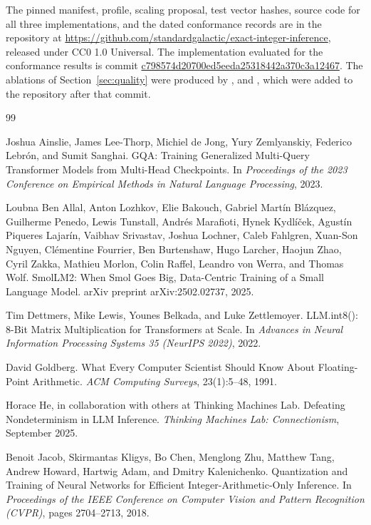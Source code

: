 \documentclass[11pt]{article}
\begin{document}
\begin{sloppypar}
The pinned manifest, profile, scaling proposal, test vector hashes, source code for all three implementations, and the dated conformance records are in the repository at \url{https://github.com/standardgalactic/exact-integer-inference}, released under CC0 1.0 Universal. The implementation evaluated for the conformance results is commit \url{c798574d20700ed5eeda25318442a370c3a12467}. The ablations of Section~\ref{sec:quality} were produced by ,  and , which were added to the repository after that commit.

\end{sloppypar}
\begin{thebibliography}{99}

Joshua Ainslie, James Lee-Thorp, Michiel de Jong, Yury Zemlyanskiy, Federico Lebr\'on, and Sumit Sanghai.
GQA: Training Generalized Multi-Query Transformer Models from Multi-Head Checkpoints.
In \emph{Proceedings of the 2023 Conference on Empirical Methods in Natural Language Processing}, 2023.

Loubna Ben Allal, Anton Lozhkov, Elie Bakouch, Gabriel Mart\'in Bl\'azquez, Guilherme Penedo, Lewis Tunstall, Andr\'es Marafioti, Hynek Kydl\'i\v{c}ek, Agust\'in Piqueres Lajar\'in, Vaibhav Srivastav, Joshua Lochner, Caleb Fahlgren, Xuan-Son Nguyen, Cl\'ementine Fourrier, Ben Burtenshaw, Hugo Larcher, Haojun Zhao, Cyril Zakka, Mathieu Morlon, Colin Raffel, Leandro von Werra, and Thomas Wolf.
SmolLM2: When Smol Goes Big, Data-Centric Training of a Small Language Model.
arXiv preprint arXiv:2502.02737, 2025.

Tim Dettmers, Mike Lewis, Younes Belkada, and Luke Zettlemoyer.
LLM.int8(): 8-Bit Matrix Multiplication for Transformers at Scale.
In \emph{Advances in Neural Information Processing Systems 35 (NeurIPS 2022)}, 2022.

David Goldberg.
What Every Computer Scientist Should Know About Floating-Point Arithmetic.
\emph{ACM Computing Surveys}, 23(1):5--48, 1991.

Horace He, in collaboration with others at Thinking Machines Lab.
Defeating Nondeterminism in LLM Inference.
\emph{Thinking Machines Lab: Connectionism}, September 2025.

Benoit Jacob, Skirmantas Kligys, Bo Chen, Menglong Zhu, Matthew Tang, Andrew Howard, Hartwig Adam, and Dmitry Kalenichenko.
Quantization and Training of Neural Networks for Efficient Integer-Arithmetic-Only Inference.
In \emph{Proceedings of the IEEE Conference on Computer Vision and Pattern Recognition (CVPR)}, pages 2704--2713, 2018.


\end{thebibliography}
\end{document}
